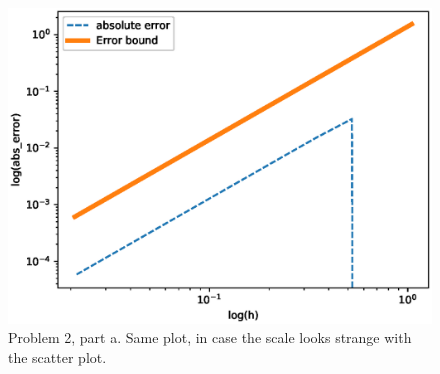 \documentclass[12pt,letterpaper]{article}
\begin{document}
\begin{figure}[h]
    \centering
    \includegraphics[width = 12cm]{Problem_2/32a.eps}
    \caption{Problem 2, part a. Same plot, in case the scale looks strange with the scatter plot.} 
    \label{fig:2a}
\end{figure}
\end{document}
